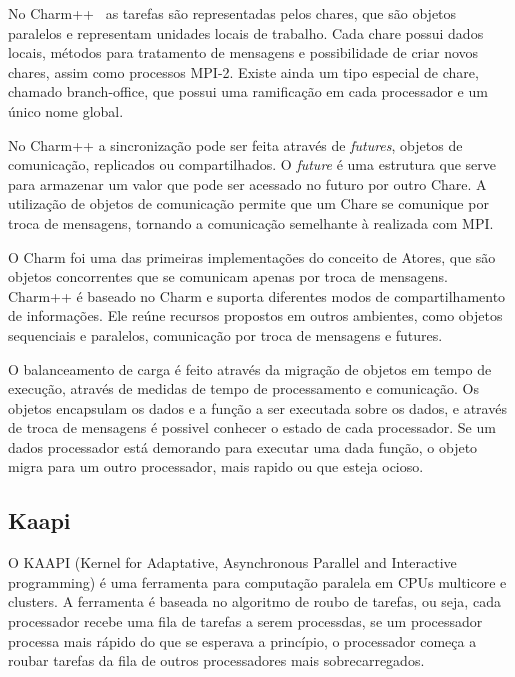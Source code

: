 No Charm++~\citep{kunzman2006charm++} as tarefas são representadas pelos chares, que são objetos paralelos e representam unidades locais de trabalho. Cada chare possui dados locais, métodos para tratamento de mensagens e possibilidade de criar novos chares, assim como processos MPI-2. Existe ainda um tipo especial de chare, chamado branch-office, que possui uma ramificação em cada processador e um único nome global. 

No Charm++ a sincronização pode ser feita através de \emph{futures}, objetos de comunicação, replicados ou compartilhados. O \emph{future}  é uma estrutura que serve para armazenar um valor que pode ser acessado no futuro por outro Chare. A utilização de objetos de comunicação permite que um Chare se comunique por troca de mensagens, tornando a comunicação semelhante à realizada com MPI.

O Charm foi uma das primeiras implementações do conceito de Atores, que são objetos concorrentes que se comunicam apenas por troca de mensagens. Charm++ é baseado no Charm e suporta diferentes modos de compartilhamento de informações. Ele reúne recursos propostos em outros ambientes, como objetos sequenciais e paralelos, comunicação por troca de mensagens e futures. 

O balanceamento de carga é feito através da migração de objetos em tempo de execução, através de medidas de tempo de processamento e comunicação. Os objetos encapsulam os dados e a função a ser executada sobre os dados, e através de troca de mensagens é possivel conhecer o estado de cada processador. Se um dados processador está demorando para executar uma dada função, o objeto migra para um outro processador, mais rapido ou que esteja ocioso. 

\subsection{Kaapi}

O KAAPI (Kernel for Adaptative, Asynchronous Parallel and Interactive programming) é uma ferramenta para computação paralela em CPUs multicore e clusters. A ferramenta é baseada no algoritmo de roubo de tarefas, ou seja, cada processador recebe uma fila de tarefas a serem processdas, se um processador processa mais rápido do que se esperava a princípio, o processador começa a roubar tarefas da fila de outros processadores mais sobrecarregados.

